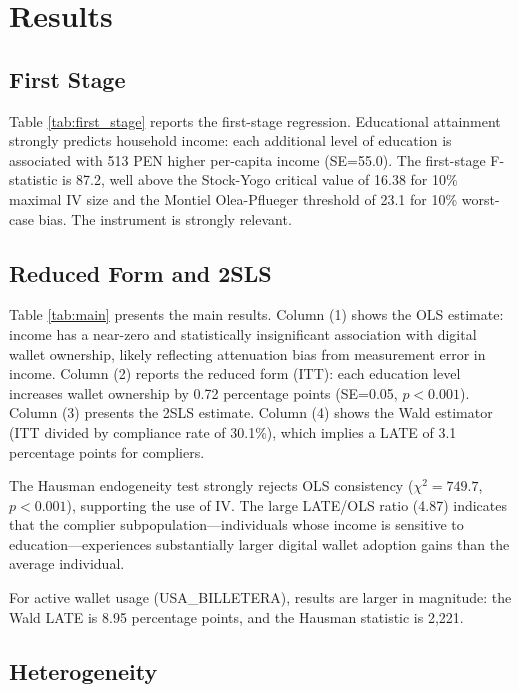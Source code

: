 \documentclass[12pt,a4paper]{article}
\begin{document}


\section{Results}
\label{sec:results}

\subsection{First Stage}

Table \ref{tab:first_stage} reports the first-stage regression. Educational
attainment strongly predicts household income: each additional level of
education is associated with 513 PEN higher per-capita income (SE=55.0). The
first-stage F-statistic is 87.2, well above the Stock-Yogo critical value of
16.38 for 10\% maximal IV size and the Montiel Olea-Pflueger threshold of 23.1
for 10\% worst-case bias. The instrument is strongly relevant.

\subsection{Reduced Form and 2SLS}



Table \ref{tab:main} presents the main results. Column (1) shows the OLS
estimate: income has a near-zero and statistically insignificant association
with digital wallet ownership, likely reflecting attenuation bias from
measurement error in income. Column (2) reports the reduced form (ITT): each
education level increases wallet ownership by 0.72 percentage points
(SE=0.05, $p < 0.001$). Column (3) presents the 2SLS estimate. Column (4)
shows the Wald estimator (ITT divided by compliance rate of 30.1\%), which
implies a LATE of 3.1 percentage points for compliers.

The Hausman endogeneity test strongly rejects OLS consistency
($\chi^2 = 749.7$, $p < 0.001$), supporting the use of IV. The large
LATE/OLS ratio (4.87) indicates that the complier subpopulation---individuals
whose income is sensitive to education---experiences substantially larger
digital wallet adoption gains than the average individual.

For active wallet usage (USA\_BILLETERA), results are larger in magnitude:
the Wald LATE is 8.95 percentage points, and the Hausman statistic is 2,221.

\subsection{Heterogeneity}
\end{document}
